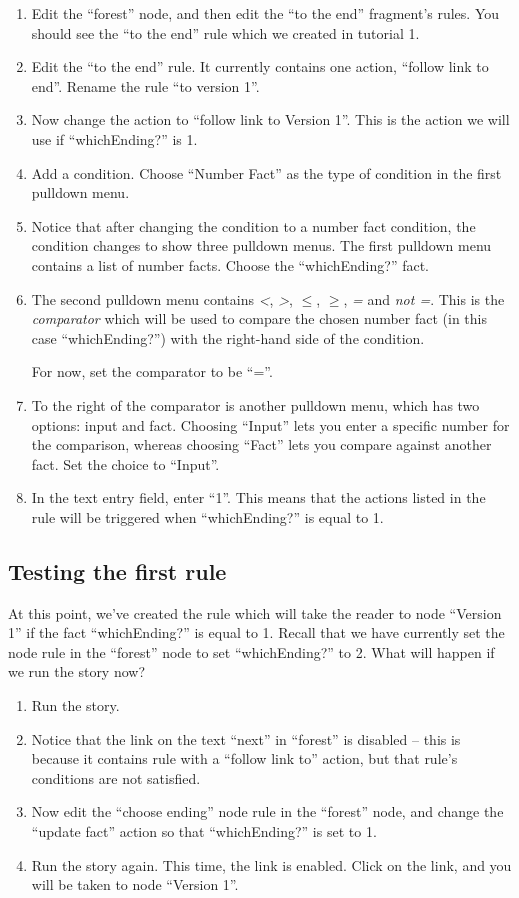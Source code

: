 \documentclass{article}
\begin{document}
\begin{enumerate}
    \item Edit the ``forest'' node, and then edit the ``to the end''  fragment's rules. You should see the ``to the end'' rule which we created in tutorial 1.
    \item Edit the ``to the end'' rule. It currently contains one action, ``follow link to end''. Rename the rule ``to version 1''.
    \item Now change the action to ``follow link to Version 1''. This is the action we will use if ``whichEnding?'' is 1.
    \item Add a condition. Choose ``Number Fact'' as the type of condition in the first pulldown menu.
    \item Notice that after changing the condition to a number fact 
    condition, the condition changes to show three pulldown menus. The first pulldown menu contains a list of number facts. Choose the ``whichEnding?'' fact.
    \item The second pulldown menu contains \textit{\textless}, \textit{\textgreater}, \textit{$\le$}, \textit{$\ge$}, \textit{=} and \textit{not =}. This is the \textit{comparator} which will be used to compare the chosen number fact (in this case ``whichEnding?'') with the right-hand side of the condition.
    
For now, set the comparator to be ``=''.
    \item To the right of the comparator is another pulldown menu, which has two options: input and fact. Choosing ``Input'' lets you enter a specific number for the comparison, whereas choosing ``Fact'' lets you compare against another fact. Set the choice to ``Input''.
    \item In the text entry field, enter ``1''. This means that the actions listed in the rule will be triggered when ``whichEnding?'' is equal to 1.
\end{enumerate}

\subsection{Testing the first rule}

At this point, we've created the rule which will take the reader to node ``Version 1'' if the fact ``whichEnding?'' is equal to 1. Recall that we have currently set the node rule in the ``forest'' node to set ``whichEnding?'' to 2. What will happen if we run the story now?

\begin{enumerate}
    \item Run the story.
    \item Notice that the link on the text ``next'' in ``forest'' is disabled -- this is because it contains rule with a ``follow link to'' action, but that rule's conditions are not satisfied.
    \item Now edit the ``choose ending'' node rule in the ``forest'' node, and change the ``update fact'' action so that ``whichEnding?'' is set to 1.
    \item Run the story again. This time, the link is enabled. Click on the link, and you will be taken to node ``Version 1''.
\end{enumerate}
\end{document}
